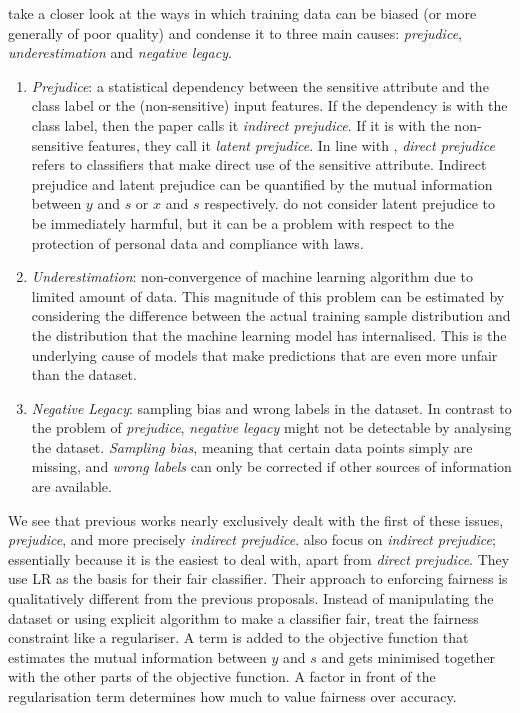\citet{kamishima2012fairness} take a closer look
at the ways in which training data can be biased (or more generally of poor quality) and condense it to three main causes:
\emph{prejudice}, \emph{underestimation} and \emph{negative legacy}.

\begin{enumerate}
\item
  \emph{Prejudice}:
  a statistical dependency between the sensitive attribute
  and the class label or the (non-sensitive) input features.
  If the dependency is with the class label, then the paper calls it \emph{indirect prejudice}.
  If it is with the non-sensitive features, they call it \emph{latent prejudice}.
  In line with \citet{pedreshi2008discrimination},
  \emph{direct prejudice} refers to classifiers that make direct use of the sensitive attribute.
  Indirect prejudice and latent prejudice can be quantified by
  the mutual information between \(y\) and \(s\) or \(x\) and \(s\) respectively.
  \citet{kamishima2012fairness} do not consider latent prejudice to be immediately harmful,
  but it can be a problem with respect to the protection of personal data and compliance with laws.
\item
  \emph{Underestimation}:
  non-convergence of machine learning algorithm due to limited amount of data.
  This magnitude of this problem can be estimated
  by considering the difference between the actual training sample distribution
  and the distribution that the machine learning model has internalised.
  This is the underlying cause of models that make predictions
  that are even more unfair than the dataset.
\item
  \emph{Negative Legacy}:
  sampling bias and wrong labels in the dataset.
  In contrast to the problem of \emph{prejudice},
  \emph{negative legacy} might not be detectable by analysing the dataset.
  \emph{Sampling bias}, meaning that certain data points simply are missing,
  and \emph{wrong labels} can only be corrected if other sources of information are available.
\end{enumerate}

We see that previous works nearly exclusively dealt with the first of these issues, \emph{prejudice},
and more precisely \emph{indirect prejudice}.
\citet{kamishima2012fairness} also focus on \emph{indirect prejudice};
essentially because it is the easiest to deal with, apart from \emph{direct prejudice}.
They use \acf{LR} as the basis for their fair classifier.
Their approach to enforcing fairness is qualitatively different from the previous proposals.
Instead of manipulating the dataset or using explicit algorithm to make a classifier fair,
\citet{kamishima2012fairness} treat the fairness constraint like a regulariser.
A term is added to the objective function
that estimates the mutual information between \(y\) and \(s\)
and gets minimised together with the other parts of the objective function.
A factor in front of the regularisation term determines how much to value fairness over accuracy.

